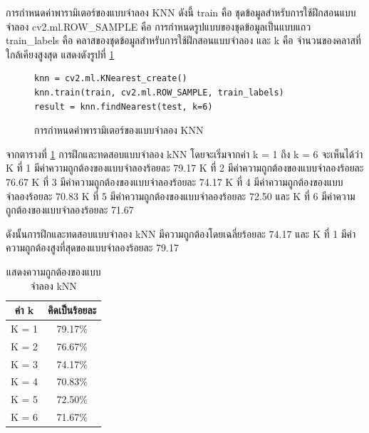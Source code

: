 \begin{enumerate}
			การกำหนดค่าพารามิเตอร์ของแบบจำลอง KNN ดังนี้ 
			train คือ ชุดข้อมูลสำหรับการใช้ฝึกสอนแบบจำลอง 
			cv2.ml.ROW{\_}SAMPLE คือ การกำหนดรูปแบบของชุดข้อมูลเป็นแบบแถว 
			train{\_}labels คือ คลาสของชุดข้อมูลสำหรับการใช้ฝึกสอนแบบจำลอง 
			และ k คือ จำนวนของคลาสที่ใกล้เคียงสูงสุด
			แสดงดังรูปที่  \ref{Fig:knn-para}

			\begin{figure}[H]
				{\begin{lstlisting}
knn = cv2.ml.KNearest_create()
knn.train(train, cv2.ml.ROW_SAMPLE, train_labels)
result = knn.findNearest(test, k=6)
				\end{lstlisting}}
				\caption{การกำหนดค่าพารามิเตอร์ของแบบจำลอง KNN}
				\label{Fig:knn-para}
			\end{figure}

			จากตารางที่ \ref{tab:KNN}	 การฝึกและทดสอบแบบจำลอง kNN โดยจะเริ่มจากค่า 
			k = 1 ถึง k = 6 จะเห็นได้ว่า 
			K ที่ 1 มีค่าความถูกต้องของแบบจำลองร้อยละ 79.17 
			K ที่ 2 มีค่าความถูกต้องของแบบจำลองร้อยละ 76.67 
			K ที่ 3 มีค่าความถูกต้องของแบบจำลองร้อยละ 74.17 
			K ที่ 4 มีค่าความถูกต้องของแบบจำลองร้อยละ 70.83 
			K ที่ 5 มีค่าความถูกต้องของแบบจำลองร้อยละ 72.50 
			และ K ที่ 6 มีค่าความถูกต้องของแบบจำลองร้อยละ 71.67 

			ดังนั้นการฝึกและทดสอบแบบจำลอง kNN มีความถูกต้องโดยเฉลี่ยร้อยละ 74.17 
			และ K ที่ 1 มีค่าความถูกต้องสูงที่สุดของแบบจำลองร้อยละ 79.17

			\begin{table}[H]
				\centering
				\caption{แสดงความถูกต้องของแบบจำลอง kNN}
				\label{tab:KNN}
				\begin{tabular}{|c|c|}
				\hline
				ค่า k & คิดเป็นร้อยละ \\ \hline				
				K = 1 &  79.17\% \\ \hline
				K = 2 &  76.67\% \\ \hline
				K = 3 &  74.17\% \\ \hline
				K = 4 &  70.83\% \\ \hline
				K = 5 &  72.50\% \\ \hline
				K = 6 &  71.67\% \\ \hline
				\end{tabular}
			\end{table}


\end{enumerate}
